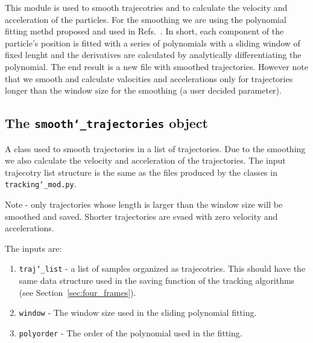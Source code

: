 \documentclass[10pt,a4paper]{article}
\begin{document}
This module is used to smooth trajecotries and to calculate the velocity and acceleration of the particles. For the smoothing we are using the polynomial fitting methd proposed and used in Refs.~\cite{Luthi2005, Shnapp2019}. In short, each component of the particle's position is fitted with a series of polynomials with a sliding window of fixed lenght and the derivatives are calculated by analytically differentiating the polynomial. The end result is a new file with smoothed trajectories. However note that we smooth and calculate valocities and accelerations only for trajectories longer than the window size for the smoothing (a user decided parameter). 


\subsection{The \texttt{smooth\char`_trajectories} object}

A class used to smooth trajectories in a list of trajectories. Due to the smoothing we also calculate the velocity and acceleration of the trajectories. The input trajecotry list structure is the same as the files produced by the classes in \texttt{tracking\char`_mod.py}.

Note - only trajectories whose length is larger than the window size will be smoothed and saved. Shorter trajectories are svaed with zero velocity and accelerations.


The inputs are:
\begin{enumerate}
	\item \texttt{traj\char`_list} -  a list of samples organized as trajecotries. This should have the same data structure used in the saving function of the tracking algorithms (see Section~\ref{sec:four_frames}). 
	\item \texttt{window} - The window size used in the sliding polynomial fitting.
	\item \texttt{polyorder} - The order of the polynomial used in the fitting. 
\end{enumerate}
\end{document}

